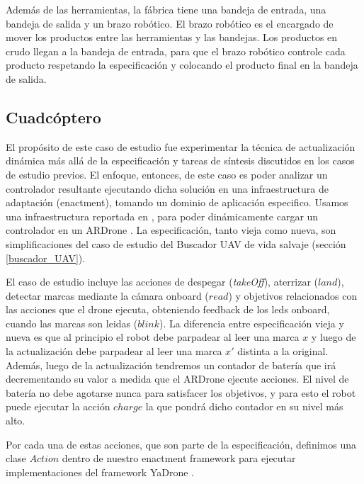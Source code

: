 Además de las herramientas, la fábrica tiene una bandeja de entrada, una bandeja de salida y un brazo robótico. El brazo
robótico es el encargado de mover los productos entre las herramientas y las bandejas. Los productos en crudo llegan a
la bandeja de entrada, para que el brazo robótico controle cada producto respetando la especificación y colocando el
producto final en la bandeja de salida.

\subsection{Cuadcóptero}

El propósito de este caso de estudio fue experimentar la técnica de actualización dinámica más allá de la especificación
y tareas de síntesis discutidos en los casos de estudio previos. El enfoque, entonces, de este caso es poder analizar un
controlador resultante ejecutando dicha solución en una infraestructura de adaptación (enactment), tomando un dominio de
aplicación especifico. Usamos una infraestructura reportada en \cite{Braberman:2013:CSM:2486788.2487002}, para poder
dinámicamente cargar un controlador en un ARDrone \cite{ARDrone}. La especificación, tanto vieja como nueva, son
simplificaciones del caso de estudio del Buscador UAV de vida salvaje (sección \ref{buscador_UAV}). 

El caso de estudio incluye las acciones de despegar (\emph{takeOff}), aterrizar ($land$), detectar marcas mediante la cámara
onboard ($read$) y objetivos relacionados con las acciones que el drone ejecuta, obteniendo feedback de los leds
onboard, cuando las marcas son leidas ($blink$). La diferencia entre especificación vieja y nueva es que al principio el
robot debe parpadear al leer una marca $x$ y luego de la actualización debe parpadear al leer una marca $x'$ distinta a
la original. Además, luego de la actualización tendremos un contador de batería que irá decrementando su valor a medida
que el ARDrone ejecute acciones. El nivel de batería no debe agotarse nunca para satisfacer los objetivos, y para esto
el robot puede ejecutar la acción $charge$ la que pondrá dicho contador en su nivel más alto.

Por cada una de estas acciones, que son parte de la especificación, definimos una clase $Action$ dentro de nuestro
enactment framework para ejecutar implementaciones del framework YaDrone \cite{YaDrone}.



